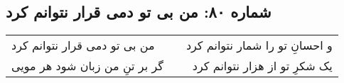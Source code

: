 \begin{center}
\section*{شماره ۸۰: من بی تو دمی قرار نتوانم کرد}
\label{sec:080}
\begin{longtable}{l p{0.5cm} r}
من بی تو دمی قرار نتوانم کرد
&&
و احسانِ تو را شمار نتوانم کرد
\\
گر بر تنِ من زبان شود هر مویی
&&
یک شکرِ تو از هزار نتوانم کرد
\\
\end{longtable}
\end{center}

